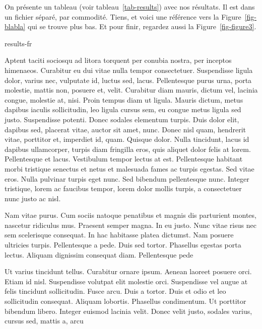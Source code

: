 \label{chap:users}
\introformatting

On présente un tableau (voir tableau~\ref{tab-results}) avec nos résultats. Il
est dans un fichier séparé, par commodité. Tiens, et voici une référence vers la
Figure~\ref{fig-blabla} qui se trouve plus bas. Et pour finir, regardez
aussi la Figure~\ref{fig-figure3}.

{results-fr}

Aptent taciti sociosqu ad litora torquent per conubia nostra, per inceptos
himenaeos. Curabitur eu dui vitae nulla tempor consectetuer. Suspendisse ligula
dolor, varius nec, vulputate id, luctus sed, lacus. Pellentesque purus urna,
porta molestie, mattis non, posuere et, velit. Curabitur diam mauris, dictum
vel, lacinia congue, molestie at, nisi. Proin tempus diam ut ligula. Mauris
dictum, metus dapibus iaculis sollicitudin, leo ligula cursus sem, eu congue
metus ligula sed justo. Suspendisse potenti. Donec sodales elementum turpis.
Duis dolor elit, dapibus sed, placerat vitae, auctor sit amet, nunc. Donec nisl
quam, hendrerit vitae, porttitor et, imperdiet id, quam. Quisque dolor. Nulla
tincidunt, lacus id dapibus ullamcorper, turpis diam fringilla eros, quis
aliquet dolor felis at lorem. Pellentesque et lacus. Vestibulum tempor lectus at
est. Pellentesque habitant morbi tristique senectus et netus et malesuada fames
ac turpis egestas. Sed vitae eros. Nulla pulvinar turpis eget nunc. Sed bibendum
pellentesque nunc. Integer tristique, lorem ac faucibus tempor, lorem dolor
mollis turpis, a consectetuer nunc justo ac nisl.

Nam vitae purus. Cum sociis natoque penatibus et magnis dis parturient montes,
nascetur ridiculus mus. Praesent semper magna. In eu justo. Nunc vitae risus nec
sem scelerisque consequat. In hac habitasse platea dictumst. Nam posuere
ultricies turpis. Pellentesque a pede. Duis sed tortor. Phasellus egestas porta
lectus. Aliquam dignissim consequat diam. Pellentesque pede~\cite{blecic98}

Ut varius tincidunt tellus. Curabitur ornare ipsum. Aenean laoreet posuere orci.
Etiam id nisl. Suspendisse volutpat elit molestie orci. Suspendisse vel augue at
felis tincidunt sollicitudin. Fusce arcu. Duis a tortor. Duis et odio et leo
sollicitudin consequat. Aliquam lobortis. Phasellus condimentum. Ut porttitor
bibendum libero. Integer euismod lacinia velit. Donec velit justo, sodales
varius, cursus sed, mattis a, arcu~\cite{hancock90}

